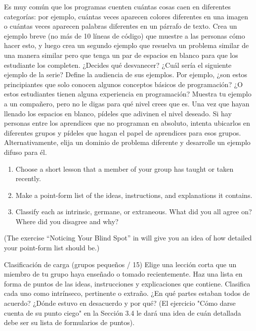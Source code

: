 Es muy común que los programas cuenten cuántas cosas caen en diferentes categorías: por ejemplo, cuántas veces aparecen colores diferentes en una imagen o cuántas veces aparecen palabras diferentes en un párrafo de texto.
Crea un ejemplo breve (no más de 10 líneas de código) que muestre a las personas cómo hacer esto, y luego crea un segundo ejemplo que resuelva un problema similar de una manera similar pero que tenga un par de espacios en blanco para que los estudiante los completen. ¿Decides qué desvanecer? ¿Cuál sería el siguiente ejemplo de la serie?
Define la audiencia de sus ejemplos. Por ejemplo, ¿son estos principiantes que solo conocen algunos conceptos básicos de programación? ¿O estos estudiantes tienen alguna experiencia en programación?
Muestra tu ejemplo a un compañero, pero no le digas para qué nivel crees que es. Una vez que hayan llenado los espacios en blanco, pídeles que adivinen el nivel deseado.
Si hay personas entre los aprendices que no programan en absoluto, intenta ubicarlos en diferentes grupos y pídeles que hagan el papel de aprendices para esos grupos. Alternativamente, elija un dominio de problema diferente y desarrolle un ejemplo difuso para él.



\begin{enumerate}

\item
  Choose a short lesson that a member of your group has taught or taken recently.

\item
  Make a point-form list of the ideas, instructions, and explanations it contains.

\item
  Classify each as intrinsic, germane, or extraneous.
  What did you all agree on?
  Where did you disagree and why?

\end{enumerate}

(The exercise ``Noticing Your Blind Spot'' in 
will give you an idea of how detailed your point-form list should be.)

Clasificación de carga (grupos pequeños / 15)
Elige una lección corta que un miembro de tu grupo haya enseñado o tomado recientemente.
Haz una lista en forma de puntos de las ideas, instrucciones y explicaciones que contiene.
Clasifica cada uno como intrínseco, pertinente o extraño. ¿En qué partes estaban todos de acuerdo? ¿Dónde estuvo en desacuerdo y por qué?
(El ejercicio "Cómo darse cuenta de su punto ciego" en la Sección  3.4 le dará una idea de cuán detallada debe ser su lista de formularios de puntos).


